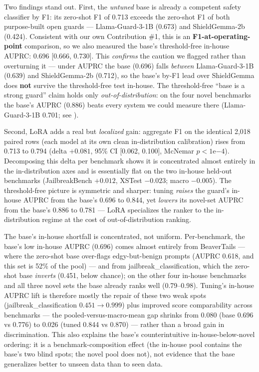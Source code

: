 \documentclass[sigconf,nonacm]{acmart}
\begin{document}
Two findings stand out. First, the \emph{untuned} base is already a competent safety classifier by F1: its zero-shot F1 of 0.713 exceeds the zero-shot F1 of both purpose-built open guards --- Llama-Guard-3-1B (0.673) and ShieldGemma-2b (0.424). Consistent with our own Contribution \#1, this is an \textbf{F1-at-operating-point} comparison, so we also measured the base's threshold-free in-house AUPRC: 0.696 [0.666, 0.730]. This \emph{confirms} the caution we flagged rather than overturning it --- under AUPRC the base (0.696) falls \emph{between} Llama-Guard-3-1B (0.639) and ShieldGemma-2b (0.712), so the base's by-F1 lead over ShieldGemma does \textbf{not} survive the threshold-free test in-house. The threshold-free ``base is a strong guard'' claim holds only \emph{out-of-distribution}: on the four novel benchmarks the base's AUPRC (0.886) beats every system we could measure there (Llama-Guard-3-1B 0.701; see ).

Second, LoRA adds a real but \emph{localized} gain: aggregate F1 on the identical 2,018 paired rows (each model at its own clean in-distribution calibration) rises from 0.713 to 0.794 (delta $+0.081$, 95\% CI [0.062, 0.100], McNemar $p < 1\mathrm{e}{-4}$). Decomposing this delta per benchmark shows it is concentrated almost entirely in the in-distribution axes and is essentially flat on the two in-house held-out benchmarks (JailbreakBench $+0.012$, XSTest $-0.023$; macro $-0.005$). The threshold-free picture is symmetric and sharper: tuning \emph{raises} the guard's in-house AUPRC from the base's 0.696 to 0.844, yet \emph{lowers} its novel-set AUPRC from the base's 0.886 to 0.781 --- LoRA specializes the ranker to the in-distribution regime at the cost of out-of-distribution ranking.

The base's in-house shortfall is concentrated, not uniform. Per-benchmark, the base's low in-house AUPRC (0.696) comes almost entirely from BeaverTails --- where the zero-shot base over-flags edgy-but-benign prompts (AUPRC 0.618, and this set is 52\% of the pool) --- and from jailbreak\_classification, which the zero-shot base \emph{inverts} (0.451, below chance); on the other four in-house benchmarks and all three novel sets the base already ranks well (0.79--0.98). Tuning's in-house AUPRC lift is therefore mostly the repair of these two weak spots (jailbreak\_classification $0.451 \to 0.999$) plus improved score comparability across benchmarks --- the pooled-versus-macro-mean gap shrinks from 0.080 (base 0.696 vs 0.776) to 0.026 (tuned 0.844 vs 0.870) --- rather than a broad gain in discrimination. This also explains the base's counterintuitive in-house-below-novel ordering: it is a benchmark-composition effect (the in-house pool contains the base's two blind spots; the novel pool does not), not evidence that the base generalizes better to unseen data than to seen data.
\end{document}

